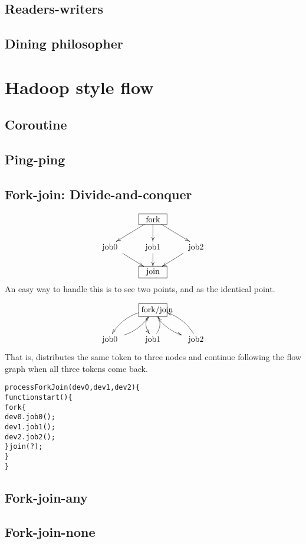 \documentclass{note}
\begin{document}
\subsection{Readers-writers}
\subsection{Dining philosopher}


\section{Hadoop style flow}
\subsection{Coroutine}
\subsection{Ping-ping}
\subsection{Fork-join: Divide-and-conquer}
\[\xymatrix@-0.5pc{
  & *+[F]\txt<1cm>{fork} \ar[d]\ar[dl]\ar[dr]\\
 \txt<1cm>{job0} \ar[dr]& \txt<1cm>{job1}\ar[d] & \txt<1cm>{job2} \ar[dl] \\
  &*+[F]\txt<1cm>{join}&
}\]
An easy way to handle this is to see two points,  and  as
the identical point. 

\[\xymatrix@-0.5pc{
  & *+[F]\txt<1cm>{fork/join} \ar@/_2ex/[dl] \ar@/_2ex/[d]\ar@/_2ex/[dr]\\
 \txt<1cm>{job0} \ar@/_2ex/[ur]& \txt<1cm>{job1}\ar@/_2ex/[u] & \txt<1cm>{job2} \ar@/_2ex/[ul] 
}\]
That is,  distributes the same token to three nodes and continue
following the flow graph when all three tokens come back.

\begin{alltt}
  \textcolor{red2}{process ForkJoin(dev0, dev1, dev2) \{
    function start() \{
      fork \{
        dev0.job0();
        dev1.job1();
        dev2.job2();
      \} join (?);
    \}
  \}}
\end{alltt}

\subsection{Fork-join-any}
\subsection{Fork-join-none}
\end{document}

